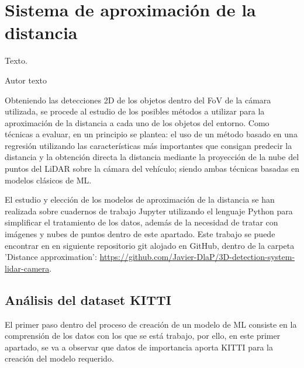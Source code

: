 \chapter{Sistema de aproximación de la distancia}
\label{cha:Sistema de aproximación de la distancia}

\begin{FraseCelebre}
  \begin{Frase}
    Texto.
  \end{Frase}
  \begin{Fuente}
    Autor texto
  \end{Fuente}
\end{FraseCelebre}

\noindent
Obteniendo las detecciones 2D de los objetos dentro del \ac{FoV} de la cámara utilizada, se procede al estudio de los posibles métodos a utilizar para la aproximación de la distancia a cada uno de los objetos del entorno. Como técnicas a evaluar, en un principio se plantea: el uso de un método basado en una regresión utilizando las características más importantes que consigan predecir la distancia y la obtención directa la distancia mediante la proyección de la nube del puntos del \ac{LiDAR} sobre la cámara del vehículo; siendo ambas técnicas basadas en modelos clásicos de \ac{ML}.

El estudio y elección de los modelos de aproximación de la distancia se han realizada sobre cuadernos de trabajo Jupyter utilizando el lenguaje Python para simplificar el tratamiento de los datos, además de la necesidad de tratar con imágenes y nubes de puntos dentro de este apartado. Este trabajo se puede encontrar en en siguiente repositorio git alojado en GitHub, dentro de la carpeta 'Distance approximation': \url{https://github.com/Javier-DlaP/3D-detection-system-lidar-camera}.

\section{Análisis del dataset KITTI}
\label{sec:Análisis del dataset KITTI}

El primer paso dentro del proceso de creación de un modelo de \ac{ML} consiste en la comprensión de los datos con los que se está trabajo, por ello, en este primer apartado, se va a observar que datos de importancia aporta KITTI para la creación del modelo requerido.

